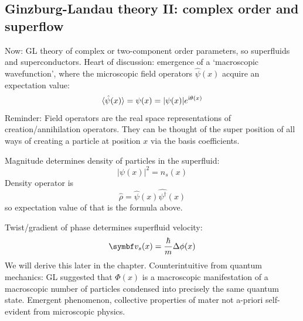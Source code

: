 \documentclass[../notes.tex]{subfiles}
\begin{document}

\subsection{Ginzburg-Landau theory II: complex order and superflow}

Now: GL theory of complex or two-component order parameters, so superfluids and superconductors.
Heart of discussion: emergence of a `macroscopic wavefunction', where the microscopic field operators \(\hat{\psi}(x)\) acquire an expectation value:
\begin{equation}
	\braket{\hat{\psi} (x)} = \psi (x) = \vert \psi (x) \vert e^{\mathrm{i} \theta(x)}
\end{equation}
Reminder: Field operators are the real space representations of creation/annihilation operators.
They can be thought of the super position of all ways of creating a particle at position \(x\) via the basis coefficients.

Magnitude determines density of particles in the superfluid:
\begin{equation}
	\vert \psi(x) \vert^2 = n_s (x)
\end{equation}
Density operator is
\begin{equation}
	\hat{\rho} = \hat{\psi} (x) \hat{\psi^{\dagger}} (x)
\end{equation}
so expectation value of that is the formula above.

Twist/gradient of phase determines superfluid velocity:
\begin{equation}
	\vb{v}_s (x) = \frac{\hbar}{m} \Delta \phi (x)
\end{equation}
We will derive this later in the chapter.
Counterintuitive from quantum mechanics: GL suggested that \(\Phi(x)\) is a macroscopic manifestation of a macroscopic number of particles condensed into precisely the same quantum state.
Emergent phenomenon, collective properties of mater not a-priori self-evident from microscopic physics.
\end{document}
